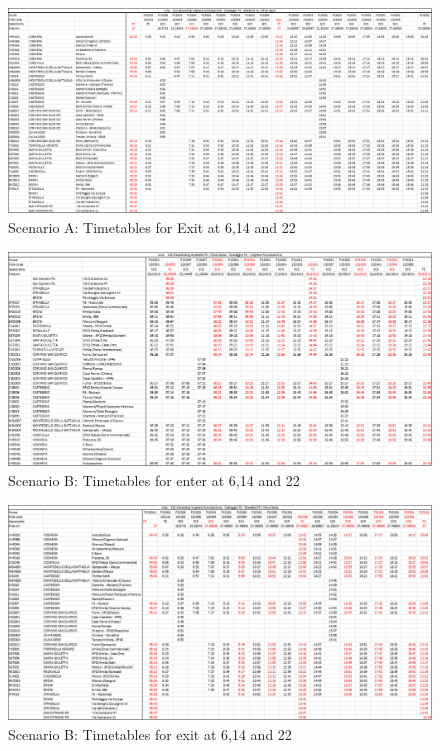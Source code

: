 \newpage
\thispagestyle{empty}
\begin{landscape}
\begin{figure}[h]
    \centering
    \includegraphics[width=1.4\textwidth]{Images/Scheduling/timetables/Scenario_A_2.png}
    \caption{Scenario A: Timetables for Exit at 6,14 and 22}
    \label{fig:A2}
\end{figure}
\end{landscape}
\newpage
\thispagestyle{empty}
\begin{landscape}
\begin{figure}[h]
    \centering
    \includegraphics[width=1.4\textwidth]{Images/Scheduling/timetables/Scenario_B.png}
    \caption{Scenario B: Timetables for enter at 6,14 and 22}
    \label{fig:B1}
\end{figure}
\end{landscape}
\newpage
\thispagestyle{empty}
\begin{landscape}
\begin{figure}[h]
    \centering
    \includegraphics[width=1.4\textwidth]{Images/Scheduling/timetables/Scenario_B_2.png}
    \caption{Scenario B: Timetables for exit at 6,14 and 22}
    \label{fig:B2}
\end{figure}
\end{landscape}
